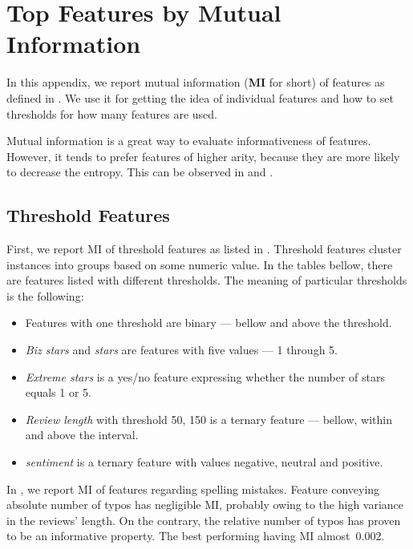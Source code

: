 \chapter{Top Features by Mutual Information}\label{app:mi}

In this appendix, we report mutual information (\textbf{MI} for short) of features as defined in .
We use it for getting the idea of individual features and how to set thresholds for how many features
are used.

Mutual information is a great way to evaluate informativeness of features.
However, it tends to prefer features of higher arity, because
they are more likely to decrease the entropy.
This can be observed in  and .


\section{Threshold Features}

First, we report MI of threshold features as listed in .
Threshold features cluster instances into groups based on some numeric value.
In the tables bellow, there are features listed with different thresholds.
The meaning of particular thresholds is the following:

\begin{itemize}
\item Features with one threshold are binary --- bellow and above the threshold.
\item \textit{Biz stars} and \textit{stars} are features with five values --- 1 through 5.
\item \textit{Extreme stars} is a yes/no feature expressing whether the number of stars equals 1 or 5.
\item \textit{Review length} with threshold 50, 150 is a ternary feature --- bellow, within and above the interval.
\item \textit{sentiment} is a ternary feature with values negative, neutral and positive.
\end{itemize}

In , we report MI of features regarding spelling mistakes.
Feature conveying absolute number of typos has negligible MI, probably owing to the high variance in the reviews' length.
On the contrary, the relative number of typos has proven to be an informative property.
The best performing having MI almost~0.002.

